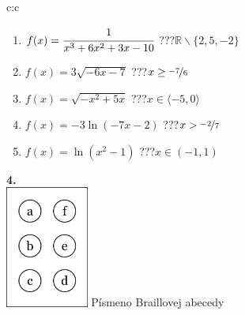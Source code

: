 \documentclass[10pt]{report}
\begin{document}
\begin{tabular}{c:c}
\begin{minipage}[c][99mm][t]{0.49\linewidth}
\begin{center}
\begin{minipage}{0.77\linewidth}
\begin{center}
\begin{varwidth}{\textwidth}
\begin{enumerate}
\item $f(x)=\cfrac{1}{x^3+6x^2+3x-10}$\quad \dotfill\; ???\;\dotfill \quad $\mathbb{R}\smallsetminus\{2,5,-2\}$
\item $f(x)=3\sqrt{-6x-7}$\quad \dotfill\; ???\;\dotfill \quad $x\geq\nicefrac{-7}{6}$
\item $f(x)=\sqrt{-x^2+5x}$\quad \dotfill\; ???\;\dotfill \quad $x\in\langle-5 , 0\rangle$
\item $f(x)=-3\ln{(-7x-2)}$\quad \dotfill\; ???\;\dotfill \quad $x>\nicefrac{-2}{7}$
\item $f(x)=\ln{(x^2-1)}$\quad \dotfill\; ???\;\dotfill \quad $x\in(-1 , 1)$
\end{enumerate}
\end{varwidth}
\end{center}
\end{minipage}
\begin{minipage}{0.20\linewidth}
\begin{center}
{\Huge\bfseries 4.} \\[2mm]
\includegraphics[height=40mm]{../images/braille.png}
{\small Písmeno Braillovej abecedy}
\end{center}
\end{minipage}
\end{center}
\end{minipage}
%
\end{tabular}
\newpage
\thispagestyle{empty}
\end{document}
